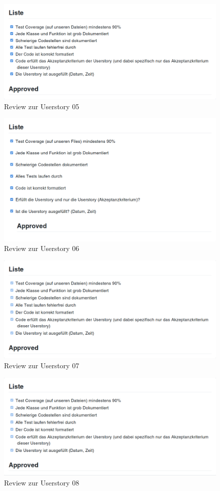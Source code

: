 \documentclass[accentcolor=tud9c,12pt,paper=a4]{tudreport}
\begin{document}
\begin{figure}[H]
\centering
\includegraphics[width=.8\textwidth]{code_review/us05}
\caption{Review zur Userstory 05}
\end{figure}

\begin{figure}[H]
\centering
\includegraphics[width=.8\textwidth]{code_review/us06}
\caption{Review zur Userstory 06}
\end{figure}

\begin{figure}[H]
\centering
\includegraphics[width=.8\textwidth]{code_review/us07}
\caption{Review zur Userstory 07}
\end{figure}

\begin{figure}[H]
\centering
\includegraphics[width=.8\textwidth]{code_review/us08}
\caption{Review zur Userstory 08}
\end{figure}
\end{document}
